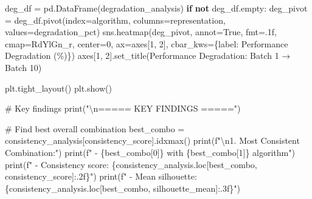 \documentclass[
  letterpaper,
  DIV=11,
  numbers=noendperiod]{scrartcl}
\newenvironment{Shaded}{\begin{snugshade}}{\end{snugshade}}
\newcommand{\BuiltInTok}[1]{\textcolor[rgb]{0.00,0.23,0.31}{#1}}
\newcommand{\CharTok}[1]{\textcolor[rgb]{0.13,0.47,0.30}{#1}}
\newcommand{\CommentTok}[1]{\textcolor[rgb]{0.37,0.37,0.37}{#1}}
\newcommand{\ControlFlowTok}[1]{\textcolor[rgb]{0.00,0.23,0.31}{\textbf{#1}}}
\newcommand{\DecValTok}[1]{\textcolor[rgb]{0.68,0.00,0.00}{#1}}
\newcommand{\KeywordTok}[1]{\textcolor[rgb]{0.00,0.23,0.31}{\textbf{#1}}}
\newcommand{\NormalTok}[1]{\textcolor[rgb]{0.00,0.23,0.31}{#1}}
\newcommand{\OperatorTok}[1]{\textcolor[rgb]{0.37,0.37,0.37}{#1}}
\newcommand{\SpecialCharTok}[1]{\textcolor[rgb]{0.37,0.37,0.37}{#1}}
\newcommand{\SpecialStringTok}[1]{\textcolor[rgb]{0.13,0.47,0.30}{#1}}
\newcommand{\StringTok}[1]{\textcolor[rgb]{0.13,0.47,0.30}{#1}}
\newcommand{\VariableTok}[1]{\textcolor[rgb]{0.07,0.07,0.07}{#1}}
\renewenvironment{Shaded}{%
  \begin{tcolorbox}[%
    enhanced,%
    colback=codebg,%
    colframe=codebg,%
    borderline west={3pt}{0pt}{sectionblue},%
    fontupper=\small\ttfamily,%
    boxrule=0pt,%
    arc=0pt,%
    boxsep=5pt,%
    left=2mm,%
    right=2mm,%
    top=2mm,%
    bottom=2mm%
  ]%
}{%
  \end{tcolorbox}%
}
\begin{document}
\begin{Shaded}
\begin{Highlighting}[]
\NormalTok{deg\_df }\OperatorTok{=}\NormalTok{ pd.DataFrame(degradation\_analysis)}
\ControlFlowTok{if} \KeywordTok{not}\NormalTok{ deg\_df.empty:}
\NormalTok{    deg\_pivot }\OperatorTok{=}\NormalTok{ deg\_df.pivot(index}\OperatorTok{=}\StringTok{\textquotesingle{}algorithm\textquotesingle{}}\NormalTok{, columns}\OperatorTok{=}\StringTok{\textquotesingle{}representation\textquotesingle{}}\NormalTok{, values}\OperatorTok{=}\StringTok{\textquotesingle{}degradation\_pct\textquotesingle{}}\NormalTok{)}
\NormalTok{    sns.heatmap(deg\_pivot, annot}\OperatorTok{=}\VariableTok{True}\NormalTok{, fmt}\OperatorTok{=}\StringTok{\textquotesingle{}.1f\textquotesingle{}}\NormalTok{, cmap}\OperatorTok{=}\StringTok{\textquotesingle{}RdYlGn\_r\textquotesingle{}}\NormalTok{, center}\OperatorTok{=}\DecValTok{0}\NormalTok{,}
\NormalTok{                ax}\OperatorTok{=}\NormalTok{axes[}\DecValTok{1}\NormalTok{, }\DecValTok{2}\NormalTok{], cbar\_kws}\OperatorTok{=}\NormalTok{\{}\StringTok{\textquotesingle{}label\textquotesingle{}}\NormalTok{: }\StringTok{\textquotesingle{}Performance Degradation (\%)\textquotesingle{}}\NormalTok{\})}
\NormalTok{    axes[}\DecValTok{1}\NormalTok{, }\DecValTok{2}\NormalTok{].set\_title(}\StringTok{\textquotesingle{}Performance Degradation: Batch 1 → Batch 10\textquotesingle{}}\NormalTok{)}

\NormalTok{plt.tight\_layout()}
\NormalTok{plt.show()}

\CommentTok{\# Key findings}
\BuiltInTok{print}\NormalTok{(}\StringTok{"}\CharTok{\textbackslash{}n}\StringTok{===== KEY FINDINGS ====="}\NormalTok{)}

\CommentTok{\# Find best overall combination}
\NormalTok{best\_combo }\OperatorTok{=}\NormalTok{ consistency\_analysis[}\StringTok{\textquotesingle{}consistency\_score\textquotesingle{}}\NormalTok{].idxmax()}
\BuiltInTok{print}\NormalTok{(}\SpecialStringTok{f"}\CharTok{\textbackslash{}n}\SpecialStringTok{1. Most Consistent Combination:"}\NormalTok{)}
\BuiltInTok{print}\NormalTok{(}\SpecialStringTok{f"   {-} }\SpecialCharTok{\{}\NormalTok{best\_combo[}\DecValTok{0}\NormalTok{]}\SpecialCharTok{\}}\SpecialStringTok{ with }\SpecialCharTok{\{}\NormalTok{best\_combo[}\DecValTok{1}\NormalTok{]}\SpecialCharTok{\}}\SpecialStringTok{ algorithm"}\NormalTok{)}
\BuiltInTok{print}\NormalTok{(}\SpecialStringTok{f"   {-} Consistency score: }\SpecialCharTok{\{}\NormalTok{consistency\_analysis}\SpecialCharTok{.}\NormalTok{loc[best\_combo, }\StringTok{\textquotesingle{}consistency\_score\textquotesingle{}}\NormalTok{]}\SpecialCharTok{:.2f\}}\SpecialStringTok{"}\NormalTok{)}
\BuiltInTok{print}\NormalTok{(}\SpecialStringTok{f"   {-} Mean silhouette: }\SpecialCharTok{\{}\NormalTok{consistency\_analysis}\SpecialCharTok{.}\NormalTok{loc[best\_combo, }\StringTok{\textquotesingle{}silhouette\_mean\textquotesingle{}}\NormalTok{]}\SpecialCharTok{:.3f\}}\SpecialStringTok{"}\NormalTok{)}


\end{Highlighting}
\end{Shaded}
\end{document}
